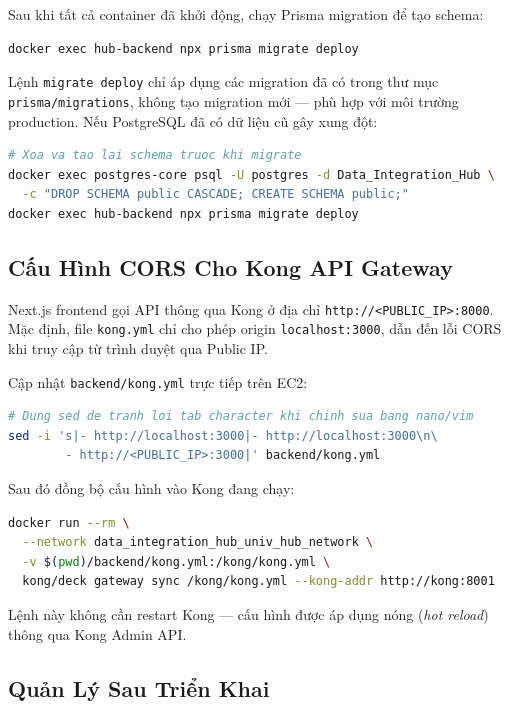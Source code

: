 Sau khi tất cả container đã khởi động, chạy Prisma migration để tạo schema:

\begin{lstlisting}[language=bash]
docker exec hub-backend npx prisma migrate deploy
\end{lstlisting}

Lệnh \texttt{migrate deploy} chỉ áp dụng các migration đã có trong thư mục
\texttt{prisma/migrations}, không tạo migration mới — phù hợp với môi trường
production. Nếu PostgreSQL đã có dữ liệu cũ gây xung đột:

\begin{lstlisting}[language=bash]
# Xoa va tao lai schema truoc khi migrate
docker exec postgres-core psql -U postgres -d Data_Integration_Hub \
  -c "DROP SCHEMA public CASCADE; CREATE SCHEMA public;"
docker exec hub-backend npx prisma migrate deploy
\end{lstlisting}

\subsection{Cấu Hình CORS Cho Kong API Gateway}

Next.js frontend gọi API thông qua Kong ở địa chỉ
\texttt{http://<PUBLIC\_IP>:8000}. Mặc định, file \texttt{kong.yml} chỉ
cho phép origin \texttt{localhost:3000}, dẫn đến lỗi CORS khi truy cập
từ trình duyệt qua Public IP.

Cập nhật \texttt{backend/kong.yml} trực tiếp trên EC2:

\begin{lstlisting}[language=bash]
# Dung sed de tranh loi tab character khi chinh sua bang nano/vim
sed -i 's|- http://localhost:3000|- http://localhost:3000\n\
        - http://<PUBLIC_IP>:3000|' backend/kong.yml
\end{lstlisting}

Sau đó đồng bộ cấu hình vào Kong đang chạy:

\begin{lstlisting}[language=bash]
docker run --rm \
  --network data_integration_hub_univ_hub_network \
  -v $(pwd)/backend/kong.yml:/kong/kong.yml \
  kong/deck gateway sync /kong/kong.yml --kong-addr http://kong:8001
\end{lstlisting}

Lệnh này không cần restart Kong — cấu hình được áp dụng nóng
(\textit{hot reload}) thông qua Kong Admin API.

\subsection{Quản Lý Sau Triển Khai}

